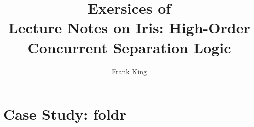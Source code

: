\documentclass[10pt]{article}
\title{Exersices of \\ \bfseries Lecture Notes on Iris: High-Order Concurrent Separation Logic}
\author{Frank King}
\begin{document}
\maketitle
\tableofcontents

\setcounter{section}{2}


\section{Case Study: foldr}

\end{document}
